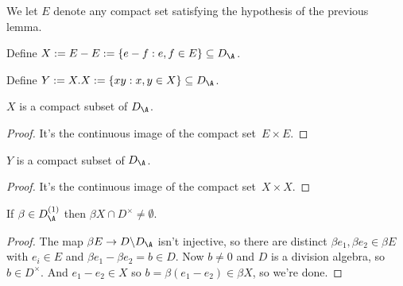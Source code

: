 \begin{definition}
  \label{NumberField.AdeleRing.DivisionAlgebra.Aux.E}
  \leanok
  We let $E$ denote any compact set satisfying the hypothesis of the previous lemma.
\end{definition}

\begin{definition}
  \label{NumberField.AdeleRing.DivisionAlgebra.Aux.X}
  \leanok
Define $X:=E-E:=\{e-f:e,f\in E\}\subseteq D_{\A}$.
\end{definition}

\begin{definition}
  \label{NumberField.AdeleRing.DivisionAlgebra.Aux.Y}
  \leanok
Define $Y:=X.X:=\{xy:x,y\in X\}\subseteq D_{\A}$.
\end{definition}

\begin{lemma}
  \label{NumberField.AdeleRing.DivisionAlgebra.Aux.X_compact}
  \leanok
  $X$ is a compact subset of $D_{\A}$.
\end{lemma}
\begin{proof}
  \leanok
  It's the continuous image of the compact set~$E\times E$.
\end{proof}

\begin{lemma}
  \label{NumberField.AdeleRing.DivisionAlgebra.Aux.Y_compact}
  \leanok
  $Y$ is a compact subset of $D_{\A}$.
\end{lemma}
\begin{proof}
  \leanok
  It's the continuous image of the compact set~$X\times X$.
\end{proof}

\begin{lemma}
  \label{NumberField.AdeleRing.DivisionAlgebra.Aux.X_meets_kernel}
  \leanok
  If $\beta\in D_{\A}^{(1)}$ then
$\beta X\cap D^\times\not=\emptyset$.
\end{lemma}
\begin{proof}
  \leanok
The map $\beta E\to D\backslash D_{\A}$ isn't injective, so there are distinct
$\beta e_1,\beta e_2\in \beta E$ with $e_i\in E$ and $\beta e_1-\beta e_2=b\in D$. Now $b\not=0$
and $D$ is a division algebra, so $b\in D^\times$. And $e_1-e_2\in X$ so $b=\beta(e_1-e_2)\in
\beta X$, so we're done.
\end{proof}

